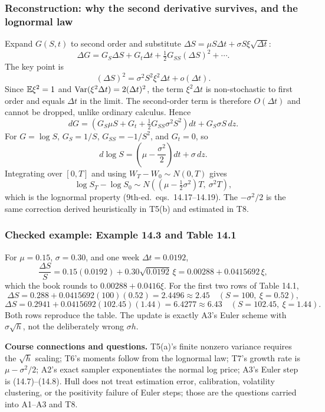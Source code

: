\subsubsection*{Reconstruction: why the second derivative survives, and the lognormal law}
Expand $G(S,t)$ to second order and substitute $\Delta S=\mu S\Delta t+\sigma S\xi\sqrt{\Delta t}$:
\[
 \Delta G=G_S\Delta S+G_t\Delta t+\tfrac12G_{SS}(\Delta S)^2+\cdots.
\]
The key point is
\[
 (\Delta S)^2=\sigma^2S^2\xi^2\Delta t+o(\Delta t).
\]
Since $\mathbb E\xi^2=1$ and $\operatorname{Var}(\xi^2\Delta t)=2(\Delta t)^2$, the term $\xi^2\Delta t$ is non-stochastic to first order and equals $\Delta t$ in the limit. The second-order term is therefore $O(\Delta t)$ and cannot be dropped, unlike ordinary calculus. Hence
\[
 dG=\left(G_S\mu S+G_t+\tfrac12G_{SS}\sigma^2S^2\right)dt+G_S\sigma S\,dz.
\]
For $G=\log S$, $G_S=1/S$, $G_{SS}=-1/S^2$, and $G_t=0$, so
\[
 d\log S=\left(\mu-\frac{\sigma^2}{2}\right)dt+\sigma\,dz.
\]
Integrating over $[0,T]$ and using $W_T-W_0\sim N(0,T)$ gives
\[
 \log S_T-\log S_0\sim N\!\left((\mu-\tfrac12\sigma^2)T,\ \sigma^2T\right),
\]
which is the lognormal property (9th-ed.\ eqs.~14.17--14.19). The $-\sigma^2/2$ is the same correction derived heuristically in T5(b) and estimated in T8.

\subsubsection*{Checked example: Example 14.3 and Table 14.1}
For $\mu=0.15$, $\sigma=0.30$, and one week $\Delta t=0.0192$,
\[
 \frac{\Delta S}{S}=0.15(0.0192)+0.30\sqrt{0.0192}\,\xi
 =0.00288+0.0415692\,\xi,
\]
which the book rounds to $0.00288+0.0416\xi$. For the first two rows of Table 14.1,
\[
 \Delta S=0.288+0.0415692(100)(0.52)=2.4496\approx2.45\quad(S=100,\ \xi=0.52),
\]
\[
 \Delta S=0.2941+0.0415692(102.45)(1.44)=6.4277\approx6.43\quad(S=102.45,\ \xi=1.44).
\]
Both rows reproduce the table. The update is exactly A3's Euler scheme with $\sigma\sqrt{h}$, not the deliberately wrong $\sigma h$.

\textbf{Course connections and questions.} T5(a)'s finite nonzero variance requires the $\sqrt{h}$ scaling; T6's moments follow from the lognormal law; T7's growth rate is $\mu-\sigma^2/2$; A2's exact sampler exponentiates the normal log price; A3's Euler step is (14.7)--(14.8). Hull does not treat estimation error, calibration, volatility clustering, or the positivity failure of Euler steps; those are the questions carried into A1--A3 and T8.
\clearpage

